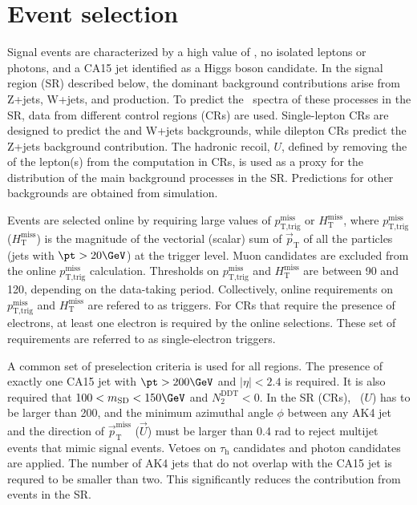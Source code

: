 \section{Event selection}


Signal events are characterized by a high value of \MET, no isolated leptons or photons, and a CA15 jet identified as a Higgs boson candidate. In the signal region (SR) described
below, the dominant background contributions arise from Z+jets,
W+jets, and \ttbar production. To predict the \ptmiss~spectra of these
processes in the SR, data from different control regions (CRs) are used. Single-lepton CRs are designed to predict the \ttbar and W+jets backgrounds, while dilepton CRs predict the Z+jets background contribution. The hadronic recoil, $U$, defined by removing the \pt of the lepton(s) from the \MET computation in CRs, is used as a proxy for the \MET distribution of the main background processes in the SR. Predictions for other backgrounds are obtained from simulation.

Events are selected online by requiring large values of $p_\text{T,trig}^\text{miss}$ or $H_{\text{T}}^{\text{miss}}$, where $p_\text{T,trig}^\text{miss}$  ($H_{\text{T}}^{\text{miss}}$) is the magnitude of the vectorial (scalar) sum of $\vec{p}_\text{T}$ of all the particles (jets with $\pt>20\GeV$) at the trigger level. Muon candidates are excluded from the online $p_\text{T,trig}^\text{miss}$ calculation.
Thresholds on $p_\text{T,trig}^\text{miss}$ and $H_{\text{T}}^{\text{miss}}$ are between 90 and 120\GeV, depending on the data-taking period. Collectively, online requirements on $p_\text{T,trig}^\text{miss}$ and $H_{\text{T}}^{\text{miss}}$ are refered to as \MET triggers.
For CRs that require the presence of electrons, at least one electron is required by the online selections. These set of requirements are referred to as single-electron triggers.

A common set of preselection criteria is used for all regions. The presence of exactly one CA15 jet with $\pt>200\GeV$ and $|\eta|<2.4$ is required. It is also required that $100<m_{\text{SD}}<150\GeV$ and $N_2^{\text{DDT}}<0$. 
 In the SR (CRs), \ptmiss~($U$) has to be larger than 200\GeV, and the minimum azimuthal angle $\phi$ between any AK4 jet and the direction of $\vec{p}_{\mathrm{T}}^{\mathrm{miss}}$ ($\vec{U}$) must be larger than 0.4 rad to reject multijet events that mimic signal events. Vetoes on $\tau_\text{h}$ candidates and photon candidates are applied. The number of AK4 jets that do not overlap with the CA15 jet is requred to be smaller than two. This significantly reduces the contribution from \ttbar events in the SR.

